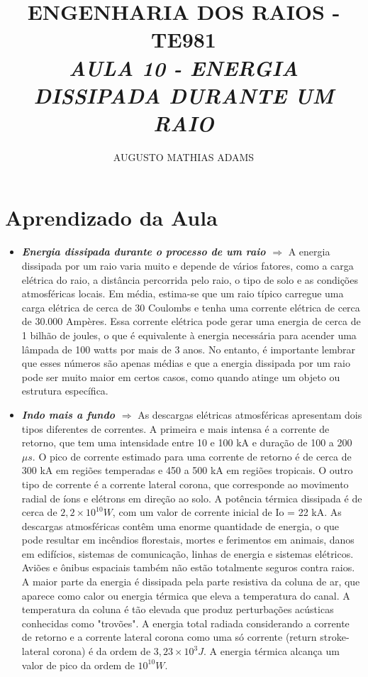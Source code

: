 \documentclass[a4paper, 12pt, onecolumn,singlespacing]{article}
\title{\normalsize{ENGENHARIA DOS RAIOS - TE981}\\ \huge{\textbf\textit{{AULA 10 - ENERGIA DISSIPADA DURANTE UM RAIO}}\\}}
\author{\small{AUGUSTO MATHIAS ADAMS}}
\begin{document}
	
	\maketitle
	
	\section{Aprendizado da Aula}
	
	\begin{itemize}
		\item \textbf{\textit{Energia dissipada durante o processo de um raio $\Rightarrow$ }} A energia dissipada por um raio varia muito e depende de vários fatores, como a carga elétrica do raio, a distância percorrida pelo raio, o tipo de solo e as condições atmosféricas locais. Em média, estima-se que um raio típico carregue uma carga elétrica de cerca de 30 Coulombs e tenha uma corrente elétrica de cerca de 30.000 Ampères. Essa corrente elétrica pode gerar uma energia de cerca de 1 bilhão de joules, o que é equivalente à energia necessária para acender uma lâmpada de 100 watts por mais de 3 anos. No entanto, é importante lembrar que esses números são apenas médias e que a energia dissipada por um raio pode ser muito maior em certos casos, como quando atinge um objeto ou estrutura específica.
		
		\item \textbf{\textit{Indo mais a fundo $\Rightarrow$ }}As descargas elétricas atmosféricas apresentam dois tipos diferentes de correntes. A primeira e mais intensa é a corrente de retorno, que tem uma intensidade entre 10 e 100 kA e duração de 100 a 200 $\mu s$. O pico de corrente estimado para uma corrente de retorno é de cerca de 300 kA em regiões temperadas e 450 a 500 kA em regiões tropicais. O outro tipo de corrente é a corrente lateral corona, que corresponde ao movimento radial de íons e elétrons em direção ao solo. A potência térmica dissipada é de cerca de $2,2 × 10^10 W$, com um valor de corrente inicial de Io = 22 kA. As descargas atmosféricas contêm uma enorme quantidade de energia, o que pode resultar em incêndios florestais, mortes e ferimentos em animais, danos em edifícios, sistemas de comunicação, linhas de energia e sistemas elétricos. Aviões e ônibus espaciais também não estão totalmente seguros contra raios. A maior parte da energia é dissipada pela parte resistiva da coluna de ar, que aparece como calor ou energia térmica que eleva a temperatura do canal. A temperatura da coluna é tão elevada que produz perturbações acústicas conhecidas como "trovões". A energia total radiada considerando a corrente de retorno e a corrente lateral corona como uma só corrente (return stroke-lateral corona) é da ordem de $3,23 × 10^3 J$. A energia térmica alcança um valor de pico da ordem de $10^{10} W$.
	\end{itemize}
	
\end{document}
